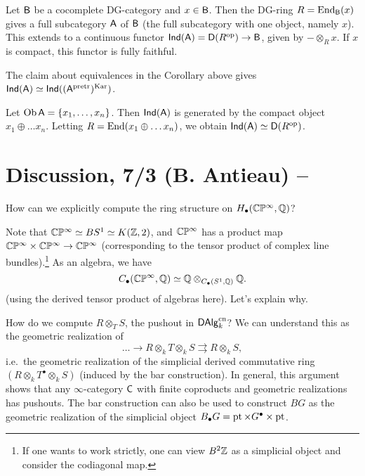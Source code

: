 \documentclass{amsart}
\begin{document}
\begin{ex}
	Let $\mathsf{B}$ be a cocomplete DG-category and $x \in \mathsf{B}$.
	Then the DG-ring $R = \operatorname{End}_{\mathsf{B}}(x)$ gives a full subcategory $\mathsf{A}$ of $\mathsf{B}$ (the full subcategory with one object, namely $x$).
	This extends to a continuous functor $\mathsf{Ind}(\mathsf{A}) = \mathsf{D}(R^{\mathrm{op}}) \to \mathsf{B}$, given by $- \otimes_R x$.
	If $x$ is compact, this functor is fully faithful.
\end{ex}

\begin{ex}
	The claim about equivalences in the Corollary above gives $\mathsf{Ind}(\mathsf{A}) \simeq \mathsf{Ind}((\mathsf{A}^{\mathrm{pretr}})^{\mathrm{Kar}})$.
\end{ex}

\begin{ex}
	Let $\operatorname{Ob} \mathsf{A} = \{ x_1, \dots, x_n \}$.
	Then $\mathsf{Ind}(\mathsf{A})$ is generated by the compact object $x_1 \oplus \dots x_n$.
	Letting $R = \operatorname{End}(x_1 \oplus \dots x_n)$, we obtain $\mathsf{Ind}(\mathsf{A}) \simeq \mathsf{D}(R^{\mathrm{op}})$.
\end{ex}

\section{Discussion, 7/3 (B. Antieau) -- }

How can we explicitly compute the ring structure on $H_\bullet(\mathbb{C}\mathbb{P}^\infty, \mathbb{Q})$?

Note that $\mathbb{C}\mathbb{P}^\infty \simeq BS^1 \simeq K(\mathbb{Z}, 2)$, and $\mathbb{C}\mathbb{P}^\infty$ has a product map $\mathbb{C}\mathbb{P}^\infty \times \mathbb{C}\mathbb{P}^\infty \to \mathbb{C}\mathbb{P}^\infty$ (corresponding to the tensor product of complex line bundles).\footnote{If one wants to work strictly, one can view $B^2 \mathbb{Z}$ as a simplicial object and consider the codiagonal map.}
As an algebra, we have 
\[
	C_\bullet(\mathbb{C}\mathbb{P}^\infty, \mathbb{Q}) \simeq \mathbb{Q} \otimes_{C_\bullet(S^1, \mathbb{Q})} \mathbb{Q}.
\]
(using the derived tensor product of algebras here).
Let's explain why.

How do we compute $R \otimes_T S$, the pushout in $\mathsf{DAlg}_k^{\mathrm{cn}}$?
We can understand this as the geometric realization of
\[
	\dots \to R \otimes_k T \otimes_k S \rightrightarrows R \otimes_k S,
\]
i.e.\ the geometric realization of the simplicial derived commutative ring $(R \otimes_k T^\bullet \otimes_k S)$ (induced by the bar construction).
In general, this argument shows that any $\infty$-category $\mathsf{C}$ with finite coproducts and geometric realizations has pushouts.
The bar construction can also be used to construct $BG$ as the geometric realization of the simplicial object $B_\bullet G = \operatorname{pt} \times G^\bullet \times \operatorname{pt}$.
\end{document}

